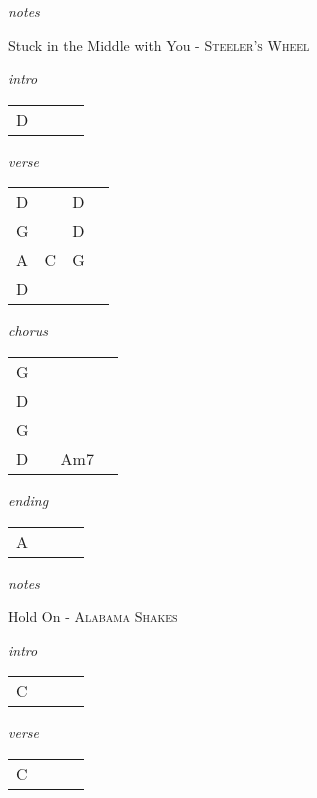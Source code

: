 \documentclass[12pt]{article}
\begin{document}
\textit{notes}

\newpage

{\Huge Stuck in the Middle with You} {\huge - \textsc{Steeler's Wheel}}

\huge
\textit{intro}

\begin{tabular}{|P{1.25in}|P{1.25in}|P{1.25in}|P{1.25in}|}
  D  &   &   &   \\
\end{tabular}

\textit{verse}

\begin{tabular}{|P{1.25in}|P{1.25in}|P{1.25in}|P{1.25in}|}
  D &   &  D &   \\
  G &   &  D &   \\
  A & C  &  G &  \\
  D &   &    &   \\
\end{tabular}

\textit{chorus}

\begin{tabular}{|P{1.25in}|P{1.25in}|P{1.25in}|P{1.25in}|}
  G &   &   &   \\
  D &   &   &   \\
  G &   &   &   \\
  D &   & Am7  &   \\
\end{tabular}

\textit{ending}

\begin{tabular}{|P{1.25in}|P{1.25in}|P{1.25in}|P{1.25in}|}
  A &   &   &   \\
\end{tabular}

\textit{notes}

\newpage

{\Huge Hold On} {\huge - \textsc{Alabama Shakes}}

\huge
\textit{intro}

\begin{tabular}{|P{1.25in}|P{1.25in}|P{1.25in}|P{1.25in}|}
  C &   &   &   \\
\end{tabular}

\textit{verse}

\begin{tabular}{|P{1.25in}|P{1.25in}|P{1.25in}|P{1.25in}|}
  C &   &   &   \\
\end{tabular}
\end{document}
